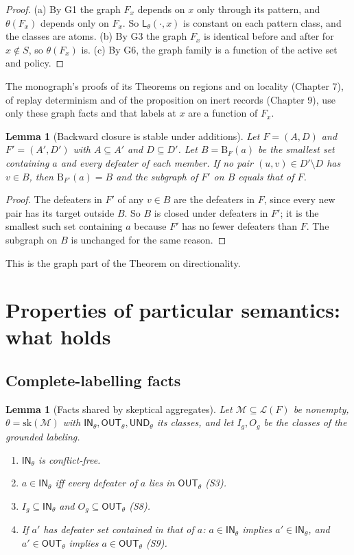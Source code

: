 \documentclass[11pt]{article}
\theoremstyle{plain}
\newtheorem{lemma}[theorem]{Lemma}
\theoremstyle{definition}
\theoremstyle{remark}
\newcommand{\IN}{\textsf{IN}}
\newcommand{\OUT}{\textsf{OUT}}
\newcommand{\UND}{\textsf{UND}}
\newcommand{\Bc}{\mathrm{B}}
\newcommand{\Lab}{\mathsf{L}}
\begin{document}
\begin{proof}
(a) By G1 the graph $F_x$ depends on $x$ only through its pattern, and $\theta(F_x)$ depends only on $F_x$. So $\Lab_\theta(\cdot,x)$ is constant on each pattern class, and the classes are atoms. (b) By G3 the graph $F_x$ is identical before and after for $x\notin S$, so $\theta(F_x)$ is. (c) By G6, the graph family is a function of the active set and policy. \qedhere
\end{proof}

The monograph's proofs of its Theorems on regions and on locality (Chapter 7), of replay determinism and of the proposition on inert records (Chapter 9), use only these graph facts and that labels at $x$ are a function of $F_x$.

\begin{lemma}[Backward closure is stable under additions]\label{lem:bc}
Let $F=(A,D)$ and $F'=(A',D')$ with $A\subseteq A'$ and $D\subseteq D'$. Let $B=\Bc_F(a)$ be the smallest set containing $a$ and every defeater of each member. If no pair $(u,v)\in D'\setminus D$ has $v\in B$, then $\Bc_{F'}(a)=B$ and the subgraph of $F'$ on $B$ equals that of $F$.
\end{lemma}

\begin{proof}
The defeaters in $F'$ of any $v\in B$ are the defeaters in $F$, since every new pair has its target outside $B$. So $B$ is closed under defeaters in $F'$; it is the smallest such set containing $a$ because $F'$ has no fewer defeaters than $F$. The subgraph on $B$ is unchanged for the same reason.
\end{proof}

This is the graph part of the Theorem on directionality.

\section{Properties of particular semantics: what holds}\label{sec:holds}

\subsection{Complete-labelling facts}

\begin{lemma}[Facts shared by skeptical aggregates]\label{lem:sk}
Let $\mathcal M\subseteq\mathcal L(F)$ be nonempty, $\theta=\mathrm{sk}(\mathcal M)$ with $\IN_\theta,\OUT_\theta,\UND_\theta$ its classes, and let $I_g,O_g$ be the classes of the grounded labeling.
\begin{enumerate}[label=(\alph*)]
\item $\IN_\theta$ is conflict-free.
\item $a\in\IN_\theta$ iff every defeater of $a$ lies in $\OUT_\theta$ (S3).
\item $I_g\subseteq\IN_\theta$ and $O_g\subseteq\OUT_\theta$ (S8).
\item If $a'$ has defeater set contained in that of $a$: $a\in\IN_\theta$ implies $a'\in\IN_\theta$, and $a'\in\OUT_\theta$ implies $a\in\OUT_\theta$ (S9).
\end{enumerate}
\end{lemma}
\end{document}
